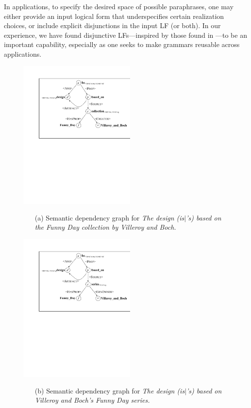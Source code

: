 \documentclass[11pt]{article}
\begin{document}
In applications, to specify the desired space of possible paraphrases,
one may either provide an input logical form that underspecifies certain
realization choices, or include explicit disjunctions in the input LF
(or both). In our experience, we have found disjunctive LFs---inspired
by those found in \cite{Shemtov:PhD}---to be an important capability,
especially as one seeks to make grammars reusable across applications.

\begin{figure}%
\begin{small}
\begin{center}
\includegraphics[width=0.52\textwidth]{ex1a} 
\end{center}
\begin{itemize}
\item[(a)] Semantic dependency graph for \textit{The design (is$\mid$'s) 
based on the Funny Day collection by Villeroy and Boch.}
\end{itemize}

\vspace{3mm}
\begin{center}
\includegraphics[width=0.52\textwidth]{ex1b} 
\end{center}
\begin{itemize}
\item[(b)] Semantic dependency graph for \textit{The design (is$\mid$'s) 
based on Villeroy and Boch's Funny Day series.}
\end{itemize}


\end{small}
\end{figure}
\end{document}
